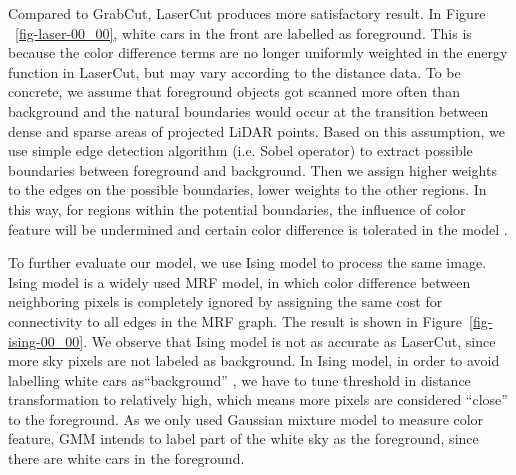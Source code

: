 \documentclass{article} %
\begin{document}
Compared to GrabCut, LaserCut produces more satisfactory result. In
Figure ~\ref{fig-laser-00_00},  white cars in the front are labelled
as foreground.
This is because the color difference terms are no longer uniformly weighted in
the energy function in LaserCut, but may vary according to the distance data.
To be concrete, we assume that foreground objects got scanned more
often than background and the natural boundaries would occur at the
transition between dense and sparse areas of projected LiDAR points. 
Based on this assumption, we use simple edge detection algorithm
(i.e. Sobel operator) to extract possible boundaries between
foreground and background. 
Then we assign higher weights to the edges on the possible
boundaries, lower weights to the other regions.
In this way, for regions within the potential boundaries,
the influence of color feature will be undermined and certain color
difference is tolerated in the model .

To further evaluate our model, we use Ising model to process the same
image. Ising model is a widely used MRF model, in which
color difference between neighboring pixels is completely ignored by
assigning the same cost for connectivity to all edges in the MRF
graph. The result is shown in Figure~\ref{fig-ising-00_00}.
We observe that Ising model is not as accurate as LaserCut, since more
sky pixels are not labeled as background.
In Ising model, in order to avoid labelling white cars
as``background'' , we have to tune threshold in distance
transformation to relatively high, which means more pixels are
considered ``close'' to the foreground. As we only used Gaussian
mixture model to measure color feature, GMM intends to
label part of the white sky as the foreground, since there are white cars in
the foreground.
\end{document}
